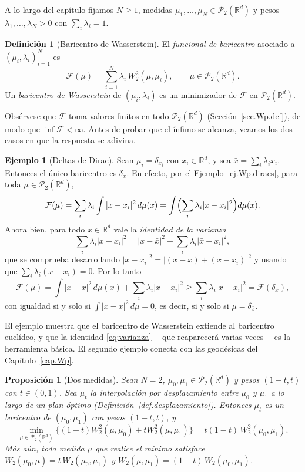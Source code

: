 \documentclass[12pt, a4paper]{amsbook}
\newcommand{\R}{{\mathbb R}}
\newtheorem{prop}[teo]{Proposición}
\theoremstyle{remark}
\theoremstyle{definition}
\newtheorem{defi}[teo]{Definición}
\newtheorem{ejem}[teo]{Ejemplo}
\numberwithin{section}{chapter}
\numberwithin{subsection}{section}
\numberwithin{equation}{section}
\numberwithin{figure}{chapter}
\begin{document}
A lo largo del capítulo fijamos $N\ge1$, medidas
$\mu_1,\dots,\mu_N\in\mathcal P_2(\R^d)$ y pesos $\lambda_1,\dots,\lambda_N>0$
con $\sum_i\lambda_i=1$.

\begin{defi}[Baricentro de Wasserstein]\label{def.baricentro}
El \emph{funcional de baricentro} asociado a $(\mu_i,\lambda_i)_{i=1}^N$ es
\[
\mathcal F(\mu)=\sum_{i=1}^N\lambda_i\,W_2^2(\mu,\mu_i),
\qquad
\mu\in\mathcal P_2(\R^d).
\]
Un \emph{baricentro de Wasserstein} de $(\mu_i,\lambda_i)$ es un minimizador
de $\mathcal F$ en $\mathcal P_2(\R^d)$.
\end{defi}

Obsérvese que $\mathcal F$ toma valores finitos en todo $\mathcal P_2(\R^d)$
(Sección~\ref{sec.Wp.def}), de modo que $\inf\mathcal F<\infty$. Antes de
probar que el ínfimo se alcanza, veamos los dos casos en que la respuesta se
adivina.

\begin{ejem}[Deltas de Dirac]\label{ej.bar.diracs}
Sean $\mu_i=\delta_{x_i}$ con $x_i\in\R^d$, y sea $\bar x=\sum_i\lambda_ix_i$.
Entonces el único baricentro es $\delta_{\bar x}$. En efecto, por el
Ejemplo~\ref{ej.Wp.diracs}, para toda $\mu\in\mathcal P_2(\R^d)$,
\[
\mathcal F(\mu)=\sum_i\lambda_i\int|x-x_i|^2\,d\mu(x)
=\int\Bigl(\sum_i\lambda_i|x-x_i|^2\Bigr)d\mu(x).
\]
Ahora bien, para todo $x\in\R^d$ vale la \emph{identidad de la varianza}
\begin{equation}\label{eq:varianza}
\sum_i\lambda_i|x-x_i|^2=|x-\bar x|^2+\sum_i\lambda_i|\bar x-x_i|^2,
\end{equation}
que se comprueba desarrollando $|x-x_i|^2=|(x-\bar x)+(\bar x-x_i)|^2$ y usando
que $\sum_i\lambda_i(\bar x-x_i)=0$. Por lo tanto
\[
\mathcal F(\mu)=\int|x-\bar x|^2\,d\mu(x)+\sum_i\lambda_i|\bar x-x_i|^2
\ge\sum_i\lambda_i|\bar x-x_i|^2=\mathcal F(\delta_{\bar x}),
\]
con igualdad si y solo si $\int|x-\bar x|^2\,d\mu=0$, es decir, si y solo si
$\mu=\delta_{\bar x}$.
\end{ejem}

El ejemplo muestra que el baricentro de Wasserstein extiende al baricentro
euclídeo, y que la identidad \eqref{eq:varianza} —que reaparecerá varias
veces— es la herramienta básica. El segundo ejemplo conecta con las geodésicas
del Capítulo~\ref{cap.Wp}.

\begin{prop}[Dos medidas]\label{prop.bar.dos}
Sean $N=2$, $\mu_0,\mu_1\in\mathcal P_2(\R^d)$ y pesos $(1-t,t)$ con
$t\in(0,1)$. Sea $\mu_t$ la interpolación por desplazamiento entre $\mu_0$ y
$\mu_1$ a lo largo de un plan óptimo (Definición~\ref{def.desplazamiento}).
Entonces $\mu_t$ es un baricentro de $(\mu_0,\mu_1)$ con pesos $(1-t,t)$, y
\[
\min_{\mu\in\mathcal P_2(\R^d)}\bigl\{(1-t)W_2^2(\mu,\mu_0)+tW_2^2(\mu,\mu_1)\bigr\}
=t(1-t)\,W_2^2(\mu_0,\mu_1).
\]
Más aún, toda medida $\mu$ que realice el mínimo satisface
$W_2(\mu_0,\mu)=t\,W_2(\mu_0,\mu_1)$ y $W_2(\mu,\mu_1)=(1-t)\,W_2(\mu_0,\mu_1)$.
\end{prop}
\end{document}

